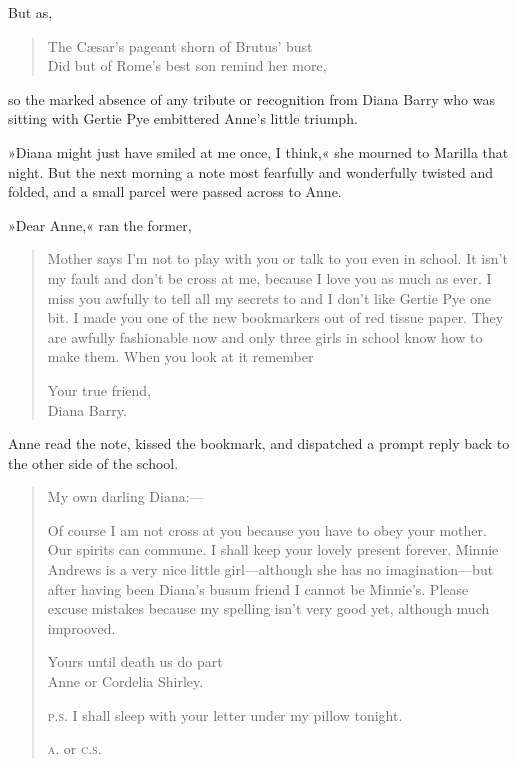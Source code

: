 But as,

\begin{verse}
The Cæsar's pageant shorn of Brutus' bust\\
Did but of Rome's best son remind her more,
\end{verse}

so the marked absence of any tribute or recognition from Diana Barry who was sitting with Gertie Pye embittered Anne's little triumph.

»Diana might just have smiled at me once, I think,« she mourned to Marilla that night. But the next morning a note most fearfully and wonderfully twisted and folded, and a small parcel were passed across to Anne.

»Dear Anne,« ran the former,
\begin{quotation}
\indent Mother says I'm not to play with you or talk to you even in school. It isn't my fault and don't be cross at me, because I love you as much as ever. I miss you awfully to tell all my secrets to and I don't like Gertie Pye one bit. I made you one of the new bookmarkers out of red tissue paper. They are awfully fashionable now and only three girls in school know how to make them. When you look at it remember

\begin{flushright}
Your true friend,\\
Diana Barry.
\end{flushright}
\end{quotation}

Anne read the note, kissed the bookmark, and dispatched a prompt reply back to the other side of the school.

\begin{quotation}
\noindent My own darling Diana:—

\indent Of course I am not cross at you because you have to obey your mother. Our spirits can commune. I shall keep your lovely present forever. Minnie Andrews is a very nice little girl—although she has no imagination—but after having been Diana's busum friend I cannot be Minnie's. Please excuse mistakes because my spelling isn't very good yet, although much improoved.
\begin{flushright}
Yours until death us do part\\
Anne or Cordelia Shirley.
\end{flushright}


\noindent \textsc{p.s.} I shall sleep with your letter under my pillow tonight.

\textsc{a.} or \textsc{c.s.}
\end{quotation}

